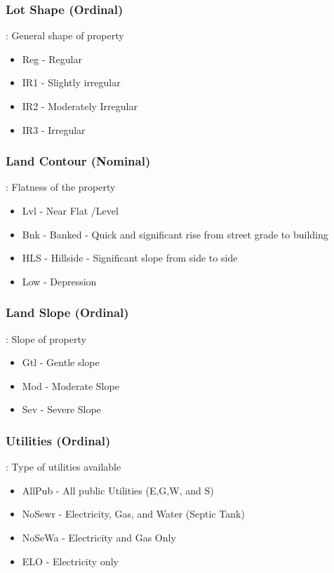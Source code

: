 \documentclass[sigconf]{acmart}
\begin{document}
	\subsubsection{Lot Shape (Ordinal)}: General shape of property
	\begin{itemize}
		\item  Reg - Regular
		\item  IR1 - Slightly irregular
		\item  IR2 - Moderately Irregular
		\item  IR3 - Irregular
	\end{itemize}

	\subsubsection{Land Contour (Nominal)}: Flatness of the property
	\begin{itemize}
		\item  Lvl - Near Flat /Level
		\item  Bnk - Banked - Quick and significant rise from street grade to building
		\item  HLS - Hillside - Significant slope from side to side
		\item  Low - Depression
	\end{itemize}
	\subsubsection{Land Slope (Ordinal)}: Slope of property
	\begin{itemize}
		\item  Gtl - Gentle slope
		\item  Mod - Moderate Slope
		\item  Sev - Severe Slope
	\end{itemize}

	\subsubsection{Utilities (Ordinal)}: Type of utilities available
	\begin{itemize}
		\item  AllPub  - All public Utilities (E,G,W, and S)
		\item  NoSewr  - Electricity, Gas, and Water (Septic Tank)
		\item  NoSeWa  - Electricity and Gas Only
		\item  ELO - Electricity only
	\end{itemize}
\end{document}
